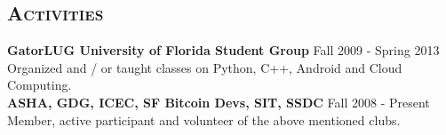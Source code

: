 \begin{resume}






\section{\textsc{Activities}}
\textbf{GatorLUG University of Florida Student Group} \hfill Fall 2009 - Spring 2013 \\
Organized and / or taught classes on Python, C++, Android and Cloud Computing.\\
\textbf{ASHA, GDG, ICEC, SF Bitcoin Devs, SIT, SSDC} \hfill Fall 2008 - Present \\
Member, active participant and volunteer of the above mentioned clubs.




\end{resume}
